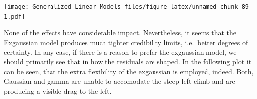 \documentclass[]{svmono}
\newenvironment{Shaded}{\begin{snugshade}}{\end{snugshade}}
\newcommand{\KeywordTok}[1]{\textcolor[rgb]{0.13,0.29,0.53}{\textbf{#1}}}
\newcommand{\DataTypeTok}[1]{\textcolor[rgb]{0.13,0.29,0.53}{#1}}
\newcommand{\DecValTok}[1]{\textcolor[rgb]{0.00,0.00,0.81}{#1}}
\newcommand{\FloatTok}[1]{\textcolor[rgb]{0.00,0.00,0.81}{#1}}
\newcommand{\StringTok}[1]{\textcolor[rgb]{0.31,0.60,0.02}{#1}}
\newcommand{\OperatorTok}[1]{\textcolor[rgb]{0.81,0.36,0.00}{\textbf{#1}}}
\newcommand{\NormalTok}[1]{#1}
\theoremstyle{definition}
\theoremstyle{definition}
\theoremstyle{definition}
\theoremstyle{remark}
\begin{document}
\begin{Shaded}
\end{Shaded}

\texttt{[image: Generalized\_Linear\_Models\_files/figure-latex/unnamed-chunk-89-1.pdf]}

None of the effects have considerable impact. Nevertheless, it seems
that the Exgaussian model produces much tighter credibility limits,
i.e.~better degrees of certainty. In any case, if there is a reason to
prefer the exgaussian model, we should primarily see that in how the
residuals are shaped. In the following plot it can be seen, that the
extra flexibility of the exgaussian is employed, indeed. Both, Gaussian
and gamma are unable to accomodate the steep left climb and are
producing a visible drag to the left.

\begin{Shaded}
\end{Shaded}
\end{document}

